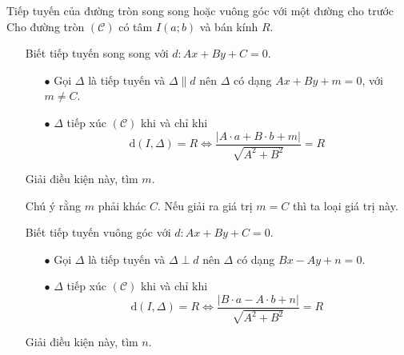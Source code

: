 \begin{dang}{Tiếp tuyến của đường tròn song song hoặc vuông góc với một đường cho trước}
	Cho đường tròn $\mathscr{(C)}$ có tâm $I(a;b)$ và bán kính $R$.
	\begin{itemize}
		\item [\iconMT]  Biết tiếp tuyến song song với $d \colon Ax + By +C=0$.
		\begin{itemize}
			\item [$\bullet$] Gọi $\Delta$ là tiếp tuyến và $\Delta \parallel d$ nên $\Delta$ có dạng $Ax + By +m=0$, với $m \ne C$.
			\item [$\bullet$] $\Delta$ tiếp xúc $\mathscr{(C)}$ khi và chỉ khi
			$$\mathrm{d}(I,\Delta)=R \Leftrightarrow \dfrac{\bigg|A\cdot a+ B \cdot b +m\bigg|}{\sqrt{A^2+B^2}}=R$$ 
		\end{itemize}
		Giải điều kiện này, tìm $m$.
		\begin{luuy}
			Chú ý rằng $m$ phải khác $C$. Nếu giải ra giá trị $m=C$ thì ta loại giá trị này. 
		\end{luuy}
		\item [\iconMT]  Biết tiếp tuyến vuông góc với $d \colon Ax + By +C=0$.
		\begin{itemize}
			\item [$\bullet$] Gọi $\Delta$ là tiếp tuyến và $\Delta \perp d$ nên $\Delta$ có dạng $Bx - Ay +n=0$.
			\item [$\bullet$] $\Delta$ tiếp xúc $\mathscr{(C)}$ khi và chỉ khi
			$$\mathrm{d}(I,\Delta)=R \Leftrightarrow \dfrac{\bigg|B\cdot a-A \cdot b +n\bigg|}{\sqrt{A^2+B^2}}=R$$ 
		\end{itemize}
		Giải điều kiện này, tìm $n$.
	\end{itemize}
\end{dang}	